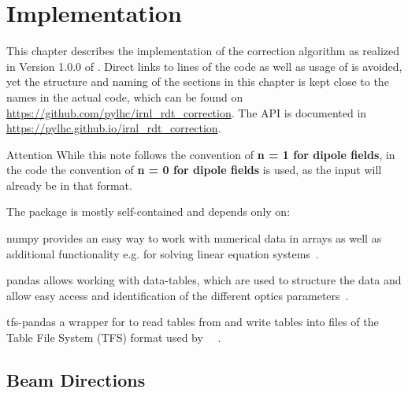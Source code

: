 \section{Implementation}
This chapter describes the implementation of the correction algorithm as 
realized in Version 1.0.0 of \cite{OMC-TeamIRNLRDTCorrection}.
Direct links to lines of the code as well as usage of  is avoided,
yet the structure and naming of the sections in this chapter is kept close to the names in the actual code,
which can be found on
\href{https://github.com/pylhc/irnl_rdt_correction}{https://github.com/pylhc/irnl\_rdt\_correction}.
The API is documented in  
\href{https://pylhc.github.io/irnl_rdt_correction}{https://pylhc.github.io/irnl\_rdt\_correction}.

\begin{important}
        \item[\color{CernRed} Attention] While this note follows the convention of \textbf{n = 1 for dipole fields}, 
        in the code the  convention of \textbf{n = 0 for dipole fields}  is used, as the input will already be in that format.
\end{important}


The package is mostly self-contained and depends only on:

\begin{options}
        \item[numpy]
        provides an easy way to work with numerical data in arrays as well as additional functionality 
        e.g. for solving linear equation systems~\cite{HarrisArrayProgrammingNumPy2020}.
        \item[pandas]
        allows working with data-tables, which are used to structure the data and allow easy access and identification 
        of the different optics parameters~\cite{pandas}.
        \item[tfs-pandas]
        a wrapper for  to read tables from  and write tables into files of 
        the Table File System (TFS) format used by ~\cite{CERNMadX}~\cite{OMC-TeamTFSPandas}.
\end{options}


\subsection{Beam Directions}
\label{sec:BeamDirection}

